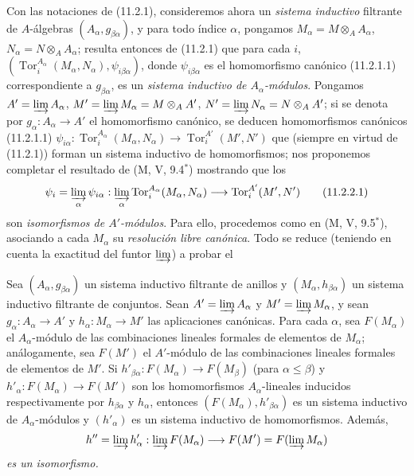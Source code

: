 \begin{env}[11.2.2]
\label{IV.11.2.2}
Con las notaciones de (11.2.1), consideremos ahora un
\emph{sistema inductivo} filtrante de $A$-álgebras
$(A_\alpha,g_{\beta\alpha})$, y para todo índice $\alpha$, pongamos
$M_\alpha=M\otimes_AA_\alpha$, $N_\alpha=N\otimes_AA_\alpha$; resulta
entonces de (11.2.1) que para cada $i$,
$(\operatorname{Tor}_i^{A_\alpha}(M_\alpha,N_\alpha),
\psi_{i\beta\alpha})$, donde $\psi_{i\beta\alpha}$ es el homomorfismo
canónico (11.2.1.1) correspondiente a $g_{\beta\alpha}$, es un \emph{sistema
inductivo de $A_\alpha$-módulos}. Pongamos
$A'=\varinjlim A_\alpha$, $M'=\varinjlim M_\alpha=M\otimes_AA'$,
$N'=\varinjlim N_\alpha=N\otimes_AA'$; si se denota por
$g_\alpha:A_\alpha\to A'$ el homomorfismo canónico, se deducen homomorfismos
canónicos (11.2.1.1)
$\psi_{i\alpha}:\operatorname{Tor}_i^{A_\alpha}(M_\alpha,N_\alpha)
\to\operatorname{Tor}_i^{A'}(M',N')$ que (siempre en virtud de (11.2.1))
forman un sistema inductivo de homomorfismos; nos proponemos
completar el resultado de (M, V, 9.4$^*$) mostrando que los
\begin{equation}
\psi_i=\varinjlim_\alpha\psi_{i\alpha}:
\varinjlim_\alpha\operatorname{Tor}_i^{A_\alpha}(M_\alpha,N_\alpha)
\to\operatorname{Tor}_i^{A'}(M',N')
\label{IV.11.2.2.1-fr}
\tag{11.2.2.1}
\end{equation}
son \emph{isomorfismos de $A'$-módulos}. Para ello, procedemos
como en (M, V, 9.5$^*$), asociando a cada $M_\alpha$ su
\emph{resolución libre canónica}. Todo se reduce (teniendo en cuenta la exactitud
del funtor $\varinjlim$) a probar el
\end{env}

\begin{lemma}[11.2.2.2]
\label{IV.11.2.2.2}
Sea $(A_\alpha,g_{\beta\alpha})$ un sistema inductivo filtrante
de anillos y $(M_\alpha,h_{\beta\alpha})$ un sistema inductivo
filtrante de conjuntos. Sean
$A'=\varinjlim A_\alpha$ y
$M'=\varinjlim M_\alpha$, y sean
$g_\alpha:A_\alpha\to A'$ y
$h_\alpha:M_\alpha\to M'$ las aplicaciones canónicas. Para
cada $\alpha$, sea $F(M_\alpha)$ el
$A_\alpha$-módulo de las combinaciones lineales formales de elementos de
$M_\alpha$; análogamente, sea $F(M')$ el
$A'$-módulo de las combinaciones lineales formales de elementos de
$M'$. Si
$h'_{\beta\alpha}:F(M_\alpha)\to F(M_\beta)$ (para $\alpha\leq\beta$) y
$h'_\alpha:F(M_\alpha)\to F(M')$
son los homomorfismos $A_\alpha$-lineales inducidos respectivamente por
$h_{\beta\alpha}$ y $h_\alpha$, entonces
$(F(M_\alpha),h'_{\beta\alpha})$ es un sistema inductivo
de $A_\alpha$-módulos y $(h'_\alpha)$ es un sistema inductivo
de homomorfismos. Además,
\[
h''=\varinjlim h'_\alpha:\varinjlim F(M_\alpha)\to
F(M')=F(\varinjlim M_\alpha)
\]
\emph{es un isomorfismo.}
\end{lemma}

